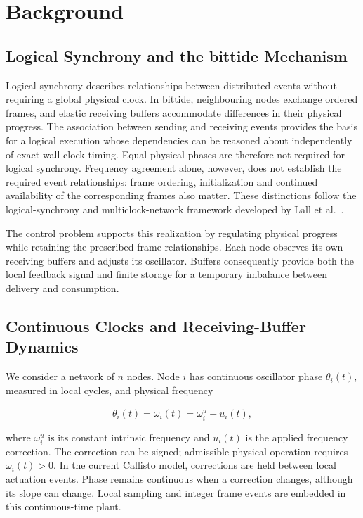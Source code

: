 \section{Background}
\label{sec:background}

\subsection{Logical Synchrony and the bittide Mechanism}

Logical synchrony describes relationships between distributed events without requiring a global physical clock. In bittide, neighbouring nodes exchange ordered frames, and elastic receiving buffers accommodate differences in their physical progress. The association between sending and receiving events provides the basis for a logical execution whose dependencies can be reasoned about independently of exact wall-clock timing. Equal physical phases are therefore not required for logical synchrony. Frequency agreement alone, however, does not establish the required event relationships: frame ordering, initialization and continued availability of the corresponding frames also matter. These distinctions follow the logical-synchrony and multiclock-network framework developed by Lall et al.~\cite{lall2024logicalSynchrony}.

The control problem supports this realization by regulating physical progress while retaining the prescribed frame relationships. Each node observes its own receiving buffers and adjusts its oscillator. Buffers consequently provide both the local feedback signal and finite storage for a temporary imbalance between delivery and consumption.

\subsection{Continuous Clocks and Receiving-Buffer Dynamics}

We consider a network of $n$ nodes. Node $i$ has continuous oscillator phase $\theta_i(t)$, measured in local cycles, and physical frequency

\begin{equation}
\dot\theta_i(t)=\omega_i(t)=\omega_i^u+u_i(t),
\end{equation}

where $\omega_i^u$ is its constant intrinsic frequency and $u_i(t)$ is the applied frequency correction. The correction can be signed; admissible physical operation requires $\omega_i(t)>0$. In the current Callisto model, corrections are held between local actuation events. Phase remains continuous when a correction changes, although its slope can change. Local sampling and integer frame events are embedded in this continuous-time plant.

